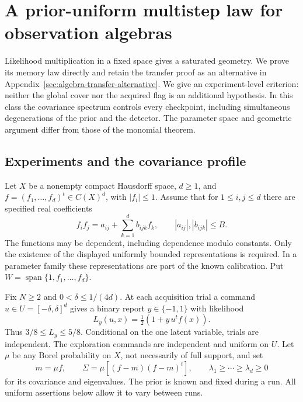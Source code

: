 \section{A prior-uniform multistep law for observation algebras}
\label{sec:algebra-multistep}
Likelihood multiplication in a fixed space gives a saturated geometry.
We prove its memory law directly and retain the transfer proof as an
alternative in Appendix~\ref{sec:algebra-transfer-alternative}. We give an experiment-level criterion: neither the
global cover nor the acquired flag is an additional hypothesis. In this
class the covariance spectrum controls every checkpoint, including
simultaneous degenerations of the prior and the detector. The parameter
space and geometric argument differ from those of the monomial theorem.

\subsection{Experiments and the covariance profile}
Let $X$ be a nonempty compact Hausdorff space, $d\ge1$, and
$f=(f_1,\ldots,f_d)^t\in C(X)^d$, with $|f_i|\le1$.
Assume that for $1\le i,j\le d$ there are specified real coefficients
\begin{equation}\label{eq:algebra-multiplication}
 f_if_j=a_{ij}+\sum_{k=1}^d b_{ijk}f_k,
 \qquad |a_{ij}|,|b_{ijk}|\le B.
\end{equation}
The functions may be dependent, including dependence modulo constants.
Only the existence of the displayed uniformly bounded representations is
required. In a parameter family these representations are part of the
known calibration. Put $W=\operatorname{span}\{1,f_1,\ldots,f_d\}$.

Fix $N\ge2$ and $0<\delta\le1/(4d)$. At each acquisition trial a
command $u\in U=[-\delta,\delta]^d$ gives a binary report $y\in\{-1,1\}$
with likelihood
\begin{equation}\label{eq:algebra-likelihood}
 L_y(u,x)=\tfrac12(1+y\,u^tf(x)).
\end{equation}
Thus $3/8\le L_y\le5/8$. Conditional on the one latent variable,
trials are independent. The exploration commands are independent and
uniform on $U$. Let $\mu$ be any Borel probability on $X$, not necessarily
of full support, and set
\begin{equation}\label{eq:algebra-covariance}
 m=\mu f,\qquad \Sigma=\mu[(f-m)(f-m)^t],\qquad
 \lambda_1\ge\cdots\ge\lambda_d\ge0
\end{equation}
for its covariance and eigenvalues. The prior is known and fixed during
a run. All uniform assertions below allow it to vary between runs.

